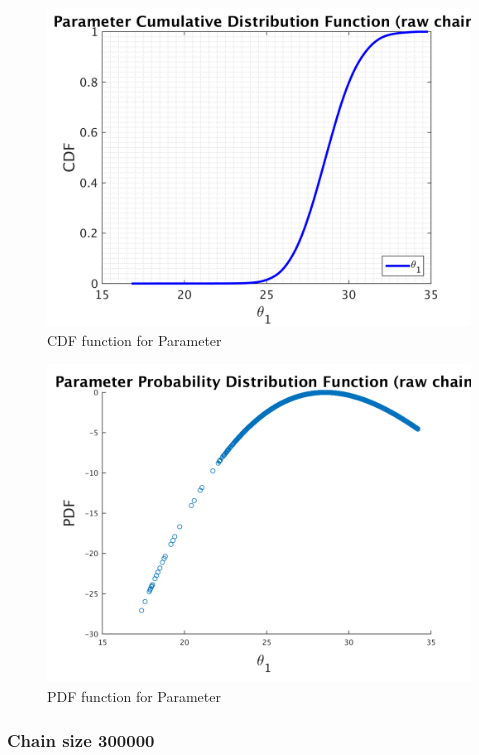 \begin{figure}[H]
  
  \centering
   \includegraphics[scale=0.75]{53_results/output_100000/simple_ip_cdf_raw}
   \caption{CDF function for Parameter }
\end{figure}



\begin{figure}[H]
  
  \centering
   \includegraphics[scale=0.75]{53_results/output_100000/ip_logLike_unified}
   \caption{PDF function for Parameter }
\end{figure}


\subsubsection{Chain size 300000 }


